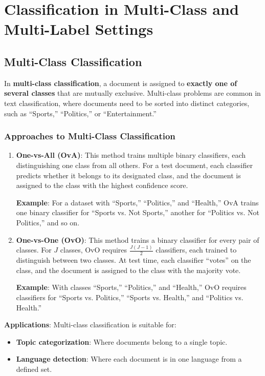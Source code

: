 \documentclass{article}
\begin{document}
\medskip
\section{Classification in Multi-Class and Multi-Label Settings}

\subsection{Multi-Class Classification}

In \textbf{multi-class classification}, a document is assigned to \textbf{exactly one of several classes} that are mutually exclusive. Multi-class problems are common in text classification, where documents need to be sorted into distinct categories, such as “Sports,” “Politics,” or “Entertainment.”

\subsubsection*{Approaches to Multi-Class Classification}
\begin{enumerate}
    \item \textbf{One-vs-All (OvA)}: This method trains multiple binary classifiers, each distinguishing one class from all others. For a test document, each classifier predicts whether it belongs to its designated class, and the document is assigned to the class with the highest confidence score.
    
    \textbf{Example}: For a dataset with “Sports,” “Politics,” and “Health,” OvA trains one binary classifier for “Sports vs. Not Sports,” another for “Politics vs. Not Politics,” and so on.

    \item \textbf{One-vs-One (OvO)}: This method trains a binary classifier for every pair of classes. For \( J \) classes, OvO requires \( \frac{J(J-1)}{2} \) classifiers, each trained to distinguish between two classes. At test time, each classifier “votes” on the class, and the document is assigned to the class with the majority vote.
    
    \textbf{Example}: With classes “Sports,” “Politics,” and “Health,” OvO requires classifiers for “Sports vs. Politics,” “Sports vs. Health,” and “Politics vs. Health.”
\end{enumerate}

\textbf{Applications}:
Multi-class classification is suitable for:
\begin{itemize}
    \item \textbf{Topic categorization}: Where documents belong to a single topic.
    \item \textbf{Language detection}: Where each document is in one language from a defined set.
\end{itemize}
\end{document}
